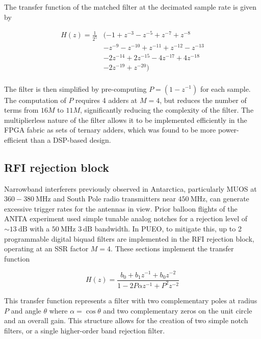 \documentclass{IEEEtran}
\begin{document}
The transfer function of the matched filter at the decimated 
sample rate is given by 

\begin{align*}
H\left(z\right) = \frac{1}{2^{5}} & (-1+z^{-3}-z^{-5}+z^{-7}+z^{-8} \\
                  & -z^{-9}-z^{-10}+z^{-11}+z^{-12}-z^{-13}   \\
                  & -2z^{-14}+2z^{-15}-4z^{-17}+4z^{-18} \\
                  & -2z^{-19}+z^{-20}) \\
\end{align*}

The filter is then simplified by pre-computing $P=\left(1-z^{-1}\right)$
for each sample. The computation of $P$ requires 4 adders at $M=4$, but
reduces the number of terms from $16M$ to $11M$, significantly
reducing the complexity of the filter. The multiplierless nature of the
filter allows it to be implemented efficiently in the FPGA fabric as
sets of ternary adders, which was found to be more power-efficient than a
DSP-based design.

\subsection{RFI rejection block}

Narrowband interferers previously observed in Antarctica, particularly 
MUOS \cite{oetting2011mobile} at $360-380~\textrm{MHz}$ and South Pole radio
transmitters near $450~\textrm{MHz}$, can generate excessive trigger rates
for the antennas in view. Prior balloon flights of the ANITA experiment
\cite{ALLISON201847} used simple tunable analog notches for a rejection
level of $\sim13~\textrm{dB}$ with a $50~\textrm{MHz}$ $3~\textrm{dB}$ bandwidth.
In PUEO, to mitigate this, up to 2 programmable digital biquad filters are 
implemented in the RFI rejection block, operating at an SSR factor $M=4$.
These sections implement the transfer function

\begin{equation}
\label{eq:iirtransfer}
H\left(z\right) = \frac{b_0+b_1z^{-1}+b_0z^{-2}}
{1-2P\alpha z^{-1}+P^{2}z^{-2}}
\end{equation}

This transfer function represents a filter with two complementary poles at
radius $P$ and angle $\theta$ where $\alpha = \cos\theta$ and two
complementary zeros on the unit circle and an overall gain. This structure
allows for the creation of two simple notch filters, or a single higher-order
band rejection filter.
\end{document}
